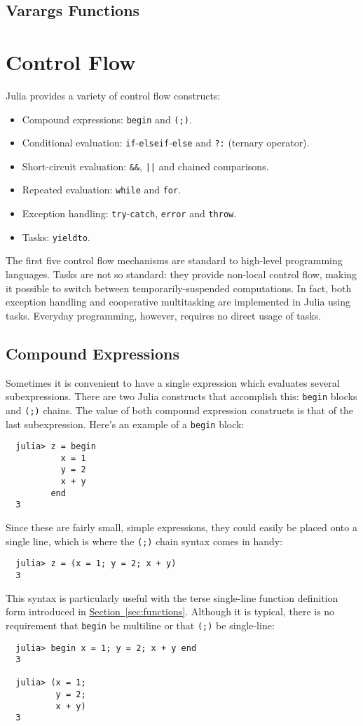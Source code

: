 \documentclass{article}
\renewcommand{\sec}[1]{\label{sec:#1}}
\newcommand{\Section}[1]{\hyperref[sec:#1]{Section~\ref*{sec:#1}}}
\begin{document}
\subsection{Varargs Functions}



\section{Control Flow}\sec{control-flow}

Julia provides a variety of control flow constructs:
\begin{itemize}
\item Compound expressions: \verb|begin| and \verb|(;)|.
\item Conditional evaluation: \verb|if|-\verb|elseif|-\verb|else| and \verb|?:| (ternary operator).
\item Short-circuit evaluation: \verb|&&|, \texttt{||} and chained comparisons.
\item Repeated evaluation: \verb|while| and \verb|for|.
\item Exception handling: \verb|try|-\verb|catch|, \verb|error| and \verb|throw|.
\item Tasks: \verb|yieldto|.
\end{itemize}
The first five control flow mechanisms are standard to high-level programming languages.
Tasks are not so standard:
they provide non-local control flow, making it possible to switch between
temporarily-suspended computations.
In fact, both exception handling and cooperative multitasking are implemented in Julia using tasks.
Everyday programming, however, requires no direct usage of tasks.

\subsection{Compound Expressions}\sec{compound-expressions}

Sometimes it is convenient to have a single expression which evaluates several subexpressions.
There are two Julia constructs that accomplish this:
\verb|begin| blocks and \verb|(;)| chains.
The value of both compound expression constructs is that of the last subexpression.
Here's an example of a \verb|begin| block:
\begin{verbatim}
  julia> z = begin
           x = 1
           y = 2
           x + y
         end
  3
\end{verbatim}
Since these are fairly small, simple expressions, they could easily be placed onto a single line, which is where the \verb|(;)| chain syntax comes in handy:
\begin{verbatim}
  julia> z = (x = 1; y = 2; x + y)
  3
\end{verbatim}
This syntax is particularly useful with the terse single-line function definition form introduced in \Section{functions}.
Although it is typical, there is no requirement that \verb|begin| be multiline or that \verb|(;)| be single-line:
\begin{verbatim}
  julia> begin x = 1; y = 2; x + y end
  3

  julia> (x = 1;
          y = 2;
          x + y)
  3
\end{verbatim}
\end{document}
